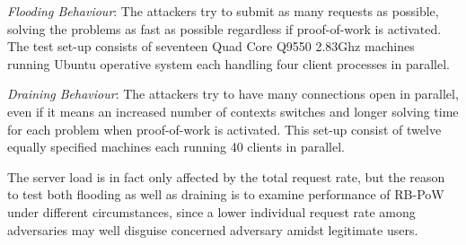 \emph{Flooding Behaviour}: The attackers try to submit as many requests as possible, solving the problems as fast as possible regardless if proof-of-work is activated. The test set-up consists of seventeen Quad Core Q9550 2.83Ghz machines running Ubuntu operative system each handling four client processes in parallel.

\emph{Draining Behaviour}: The attackers try to have many connections open in parallel, even if it means an increased number of contexts switches and longer solving time for each problem when proof-of-work is activated. This set-up consist of twelve equally specified machines each running 40 clients in parallel.

The server load is in fact only affected by the total request rate, but the reason to test both flooding as well as draining is to examine performance of RB-PoW under different circumstances, since a lower individual request rate among adversaries may well disguise concerned adversary amidst legitimate users.


